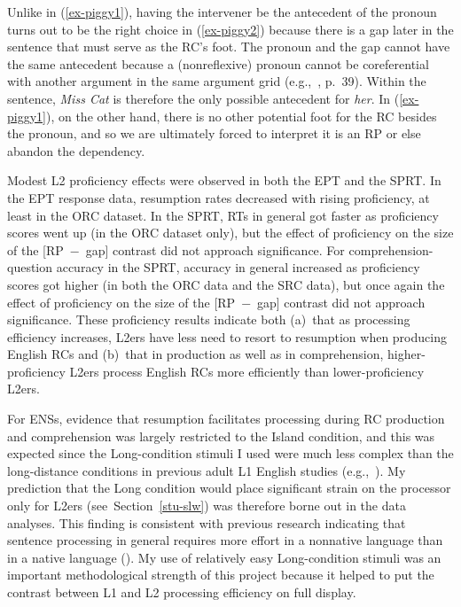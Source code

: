 \noindent Unlike in (\ref{ex-piggy1}), having the intervener be the antecedent of the pronoun turns out to be the right choice in (\ref{ex-piggy2}) because there is a gap later in the sentence that must serve as the RC's foot. The pronoun and the gap cannot have the same antecedent because a (nonreflexive) pronoun cannot be coreferential with another argument in the same argument grid (e.g.,~\cite{ogrady2005}, p.~39). Within the sentence, \textit{Miss Cat} is therefore the only possible antecedent for \textit{her}. In (\ref{ex-piggy1}), on the other hand, there is no other potential foot for the RC besides the pronoun, and so we are ultimately forced to interpret it is an RP or else abandon the dependency.


Modest L2 proficiency effects were observed in both the EPT and the SPRT. In the EPT response data, resumption rates decreased with rising proficiency, at least in the ORC dataset. In the SPRT, RTs in general got faster as proficiency scores went up (in the ORC dataset only), but the effect of proficiency on the size of the [RP~−~gap] contrast did not approach significance. For comprehension-question accuracy in the SPRT, accuracy in general increased as proficiency scores got higher (in both the ORC data and the SRC data), but once again the effect of proficiency on the size of the [RP~−~gap] contrast did not approach significance. These proficiency results indicate both (a)~that as processing efficiency increases, L2ers have less need to resort to resumption when producing English RCs and (b)~that in production as well as in comprehension, higher-proficiency L2ers process English RCs more efficiently than lower-proficiency L2ers.

For ENSs, evidence that resumption facilitates processing during RC production and comprehension was largely restricted to the Island condition, and this was expected since the Long-condition stimuli I used were much less complex than the long-distance conditions in previous adult L1 English studies (e.g.,~\cite{hofmeister.norcliffe2013}). My prediction that the Long condition would place significant strain on the processor only for L2ers (see~Section~\ref{stu-slw}) was therefore borne out in the data analyses. This finding is consistent with previous research indicating that sentence processing in general requires more effort in a nonnative language than in a native language (\cite{hopp2014,kilborn1992}). My use of relatively easy Long-condition stimuli was an important methodological strength of this project because it helped to put the contrast between L1 and L2 processing efficiency on full display.

